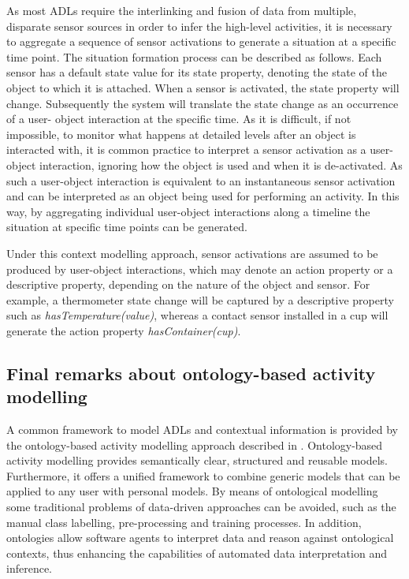 As most ADLs require the interlinking and fusion of data from multiple, disparate sensor sources in order to infer the high-level activities, it is necessary to aggregate a sequence of sensor activations to generate a situation at a specific time point. The situation formation process can be described as follows. Each sensor has a default state value for its state property, denoting the state of the object to which it is attached. When a sensor is activated, the state property will change. Subsequently the system will translate the state change as an occurrence of a user- object interaction at the specific time. As it is difficult, if not impossible, to monitor what happens at detailed levels after an object is interacted with, it is common practice to interpret a sensor activation as a user-object interaction, ignoring how the object is used and when it is de-activated. As such a user-object interaction is equivalent to an instantaneous sensor activation and can be interpreted as an object being used for performing an activity. In this way, by aggregating individual user-object interactions along a timeline the situation at specific time points can be generated. 

Under this context modelling approach, sensor activations are assumed to be produced by user-object interactions, which may denote an action property or a descriptive property, depending on the nature of the object and sensor. For example, a thermometer state change will be captured by a descriptive property such as \textit{hasTemperature(value)}, whereas a contact sensor installed in a cup will generate the action property \textit{hasContainer(cup)}. 

\subsection{Final remarks about ontology-based activity modelling}

A common framework to model ADLs and contextual information is provided by the ontology-based activity modelling approach described in \cite{Chen2012a}. Ontology-based activity modelling provides semantically clear, structured and reusable models. Furthermore, it offers a unified framework to combine generic models that can be applied to any user with personal models. By means of ontological modelling some traditional problems of data-driven approaches can be avoided, such as the manual class labelling, pre-processing and training processes. In addition, ontologies allow software agents to interpret data and reason against ontological contexts, thus enhancing the capabilities of automated data interpretation and inference.

